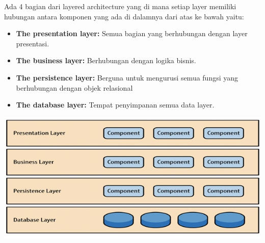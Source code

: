 \documentclass[a4paper,12pt]{article}
\begin{document}
Ada 4 bagian dari layered architecture yang di mana setiap layer memiliki hubungan antara komponen yang ada di dalamnya dari atas ke bawah yaitu:

\begin{itemize}
	\item \textbf{The presentation layer:} Semua bagian yang berhubungan dengan layer presentasi.
	\item \textbf{The business layer:} Berhubungan dengan logika bisnis.
	\item \textbf{The persistence layer:} Berguna untuk mengurusi semua fungsi yang berhubungan dengan objek relasional

	\item \textbf{The database layer:} Tempat penyimpanan semua data layer.
\end{itemize}

\includegraphics{Img/Design Pattern 2.png}
\end{document}
